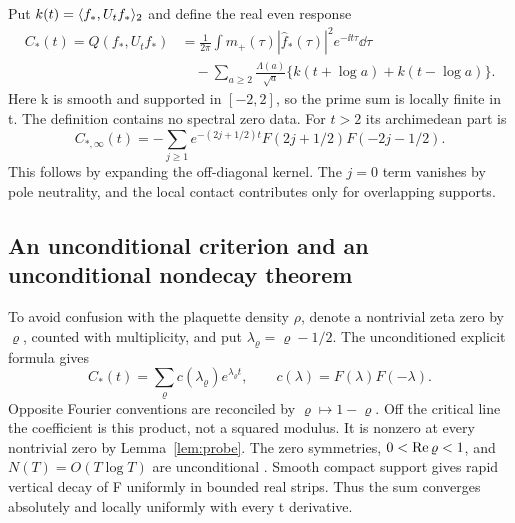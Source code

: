 Put $k(t)=\langle f_*,U_tf_*\rangle_2$ and define the real even response
\begin{align}\label{eq:C-star}
C_*(t)=Q(f_*,U_tf_*)&=
\frac1{2\pi}\int m_+(\tau)|\widehat f_*(\tau)|^2
                                     e^{-\ii t\tau}\dd\tau\\
&\quad-\sum_{a\ge2}\frac{\Lambda(a)}{\sqrt a}
                  \{k(t+\log a)+k(t-\log a)\}.\nonumber
\end{align}
Here k is smooth and supported in $[-2,2]$, so the prime
sum is locally finite in t. The definition contains no
spectral zero data. For $t>2$ its archimedean part is
\begin{equation}
C_{*,\infty}(t)=
-\sum_{j\ge1}e^{-(2j+1/2)t}
                   F(2j+1/2)F(-2j-1/2).
\end{equation}
This follows by expanding the off-diagonal kernel.
The $j=0$ term vanishes by pole neutrality, and the local
contact contributes only for overlapping supports.

\subsection{An unconditional criterion and an unconditional nondecay theorem}
To avoid confusion with the plaquette density $\rho$, denote
a nontrivial zeta zero by $\varrho$, counted with multiplicity,
and put $\lambda_\varrho=\varrho-1/2$.
The unconditioned explicit formula \cite{cc} gives
\begin{equation}\label{eq:C-zeros}
C_*(t)=\sum_\varrho c(\lambda_\varrho)e^{\lambda_\varrho t},
\qquad c(\lambda)=F(\lambda)F(-\lambda).
\end{equation}
Opposite Fourier conventions are reconciled by
$\varrho\mapsto1-\varrho$. Off the critical line the
coefficient is this product, not a squared modulus.
It is nonzero at every nontrivial zero by Lemma~\ref{lem:probe}.
The zero symmetries, $0<\operatorname{Re}\varrho<1$, and
$N(T)=O(T\log T)$ are unconditional \cite{dlmf,elkies}.
Smooth compact support gives rapid vertical decay of F
uniformly in bounded real strips. Thus the sum converges
absolutely and locally uniformly with every t derivative.

